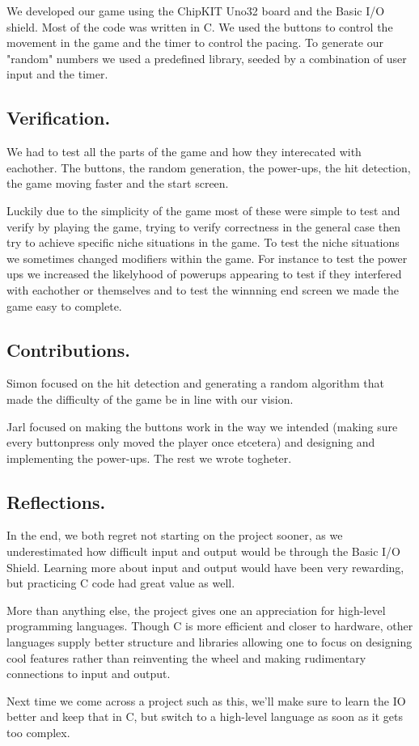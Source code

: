 \documentclass[a4paper,11pt,twoside]{article}
\begin{document}
We developed our game using the ChipKIT Uno32 board and the Basic I/O shield. Most of the code was written in C. We used the buttons to control the movement in the game and the timer to control the pacing. To generate our "random" numbers we used a predefined library, seeded by a combination of user input and the timer.

\subsection*{Verification.}

We had to test all the parts of the game and how they interecated with eachother. The buttons, the random generation, the power-ups, the hit detection, the game moving faster and the start screen.\par
Luckily due to the simplicity of the game most of these were simple to test and verify by playing the game, trying to verify correctness in the general case then try to achieve specific niche situations in the game. To test the niche situations we sometimes changed modifiers within the game. For instance to test the power ups we increased the likelyhood of powerups appearing to test if they interfered with eachother or themselves and to test the winnning end screen we made the game easy to complete.

\newpage

\subsection*{Contributions.}

Simon focused on the hit detection and generating a random algorithm that made the difficulty of the game be in line with our vision.\par
Jarl focused on making the buttons work in the way we intended (making sure every buttonpress only moved the player once etcetera) and designing and implementing the power-ups. The rest we wrote togheter.

\subsection*{Reflections.}

In the end, we both regret not starting on the project sooner, as we underestimated how difficult input and output would be through the Basic I/O Shield. Learning more about input and output would have been very rewarding, but practicing C code had great value as well.\par
More than anything else, the project gives one an appreciation for high-level programming languages. Though C is more efficient and closer to hardware, other languages supply better structure and libraries allowing one to focus on designing cool features rather than reinventing the wheel and making rudimentary connections to input and output.\par
Next time we come across a project such as this, we'll make sure to learn the IO better and keep that in C, but switch to a high-level language as soon as it gets too complex.
\end{document}
